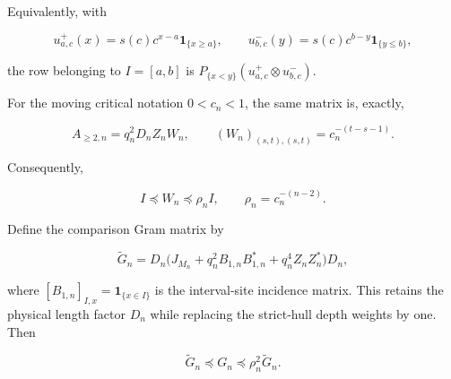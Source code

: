 \begin{proposition}
Equivalently, with

\[
 u^+_{a,c}(x)=s(c)c^{x-a}\mathbf1_{\{x\ge a\}},\qquad
 u^-_{b,c}(y)=s(c)c^{b-y}\mathbf1_{\{y\le b\}},
\]

the row belonging to \(I=[a,b]\) is
\(P_{\{x<y\}}(u^+_{a,c}\otimes u^-_{b,c})\).

For the moving critical notation \(0<c_n<1\), the same matrix is, exactly,

\begin{equation}\label{eq:supp-exact-hull}
 A_{\ge2,n}=q_n^2D_nZ_nW_n,
 \qquad (W_n)_{(s,t),(s,t)}=c_n^{-(t-s-1)}.
\end{equation}

Consequently,

\begin{equation}\label{eq:supp-hull-order}
 I\preceq W_n\preceq\rho_n I,
 \qquad \rho_n=c_n^{-(n-2)}.
\end{equation}

Define the comparison Gram matrix by

\begin{equation}\label{eq:supp-unweighted-comparison-gram}
 \widetilde G_n
 =D_n\bigl(J_{M_n}+q_n^2B_{1,n}B_{1,n}^*
 +q_n^4Z_nZ_n^*\bigr)D_n,
\end{equation}

where \([B_{1,n}]_{I,x}=\mathbf1_{\{x\in I\}}\) is the interval-site
incidence matrix. This retains the physical length factor \(D_n\) while
replacing the strict-hull depth weights by one. Then

\begin{equation}\label{eq:supp-full-hull-sandwich}
 \widetilde G_n\preceq G_n\preceq\rho_n^2\widetilde G_n.
\end{equation}
\end{proposition}

